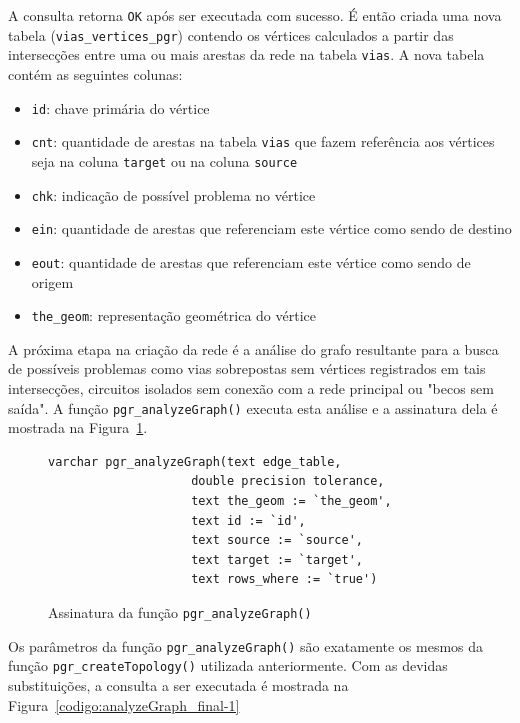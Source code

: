 \documentclass[oneside,openright,12pt]{ufsm_2015} %
\begin{document}
A consulta retorna {\tt OK} após ser executada com sucesso. É então criada uma nova tabela ({\tt vias\_vertices\_pgr}) contendo os vértices calculados a partir das intersecções entre uma ou mais arestas da rede na tabela {\tt vias}. 
A nova tabela contém as seguintes colunas:


\begin{itemize}
    \item {\tt id}: chave primária do vértice
    \item {\tt cnt}: quantidade de arestas na tabela {\tt vias} que fazem referência aos vértices seja na coluna {\tt target} ou na coluna {\tt source}
    \item {\tt chk}: indicação de possível problema no vértice
    \item {\tt ein}: quantidade de arestas que referenciam este vértice como sendo de destino
    \item {\tt eout}: quantidade de arestas que referenciam este vértice como sendo de origem
    \item {\tt the\_geom}: representação geométrica do vértice
\end{itemize}

A próxima etapa na criação da rede é a análise do grafo resultante para a busca de possíveis problemas como vias sobrepostas sem vértices registrados em tais intersecções, circuitos isolados sem conexão com a rede principal ou "becos sem saída". A função {\tt pgr\_analyzeGraph()} executa esta análise e a assinatura dela é mostrada na Figura~\ref{codigo:analyzeGraph}.

\begin{figure}[h!]
    \centering
      \caption{Assinatura da função {\tt pgr\_analyzeGraph()}}
    \label{codigo:analyzeGraph}
    \begin{lstlisting}[]
varchar pgr_analyzeGraph(text edge_table,
                    double precision tolerance,
                    text the_geom := `the_geom',
                    text id := `id',
                    text source := `source',
                    text target := `target',
                    text rows_where := `true')    
\end{lstlisting}
\end{figure}




Os parâmetros da função {\tt pgr\_analyzeGraph()} são exatamente os mesmos da função {\tt pgr\_createTopology()} utilizada anteriormente. 
Com as devidas substituições, a consulta a ser executada é mostrada na Figura~\ref{codigo:analyzeGraph_final-1}
\end{document}
